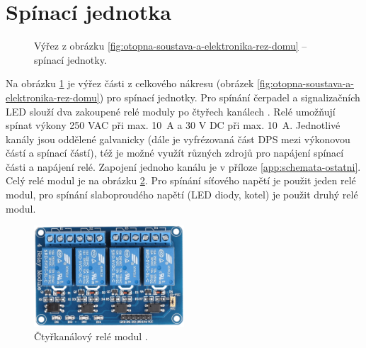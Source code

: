 \section{Spínací jednotka}
\begin{figure}[H]
   \centering
   \def\svgwidth{0.4\columnwidth}
   
    \caption[Umístění spínacích jednotek.]{Výřez z obrázku \ref{fig:otopna-soustava-a-elektronika-rez-domu} – spínací jednotky.}
    \label{fig:vyrez-spinaci-jednotka}
\end{figure}
Na obrázku \ref{fig:vyrez-spinaci-jednotka} je výřez části z celkového nákresu (obrázek \ref{fig:otopna-soustava-a-elektronika-rez-domu}) pro spínací jednotky. Pro spínání čerpadel a signalizačních LED slouží dva zakoupené relé moduly po čtyřech kanálech \cite{rele-modul-informace}. Relé umožňují spínat výkony 250 VAC při max. 10~A a 30 V DC při max. 10~A. Jednotlivé kanály jsou oddělené galvanicky (dále je vyfrézovaná část DPS mezi výkonovou částí a spínací částí), též je možné využít různých zdrojů pro napájení spínací části a napájení relé. Zapojení jednoho kanálu je v příloze \ref{app:schemata-ostatni}. Celý relé modul je na obrázku \ref{fig:ctyr-kanalovy-rele-modul}. Pro spínání síťového napětí je použit jeden relé modul, pro spínání slaboproudého napětí (LED diody, kotel) je použit druhý relé modul.



\begin{figure}[H]
    \centering
    \includegraphics[width=0.5\textwidth]{images/ctyr-kanalovy-rele-modul.png}
    \caption[Čtyřkanálový relé modul.]{Čtyřkanálový relé modul \cite{ctyr-kanalovy-rele-modul}.}
    \label{fig:ctyr-kanalovy-rele-modul}
\end{figure}